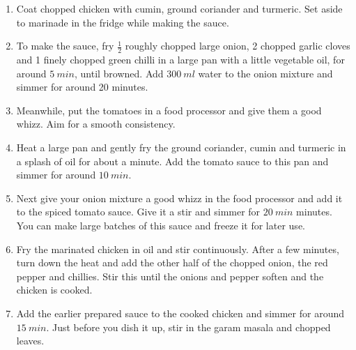 \documentclass[11pt,a4paper]{article}
\begin{document}
\begin{enumerate}
  \item Coat chopped chicken with cumin, ground coriander and turmeric. Set aside to marinade in the fridge while making the sauce.
  \item To make the sauce, fry $ \frac {1}{2} $ roughly chopped large onion, 2 chopped garlic cloves and 1 finely chopped green chilli in a large pan with a little vegetable oil, for around $ \qty{5}{min} $, until browned. Add $ \qty{300}{ml} $ water to the onion mixture and simmer for around 20 minutes.
  \item Meanwhile, put the tomatoes in a food processor and give them a good whizz. Aim for a smooth consistency. 
  \item Heat a large pan and gently fry the ground coriander, cumin and turmeric in a splash of oil for about a minute. Add the tomato sauce to this pan and simmer for around $ \qty{10}{min} $.
  \item Next give your onion mixture a good whizz in the food processor and add it to the spiced tomato sauce. Give it a stir and simmer for $ \qty{20}{min} $ minutes. You can make large batches of this sauce and freeze it for later use.
  \item Fry the marinated chicken in oil and stir continuously. After a few minutes, turn down the heat and add the other half of the chopped onion, the red pepper and chillies. Stir this until the onions and pepper soften and the chicken is cooked.
  \item Add the earlier prepared sauce to the cooked chicken and simmer for around $ \qty{15}{min} $. Just before you dish it up, stir in the garam masala and chopped leaves. 

\end{enumerate}
\end{document}
